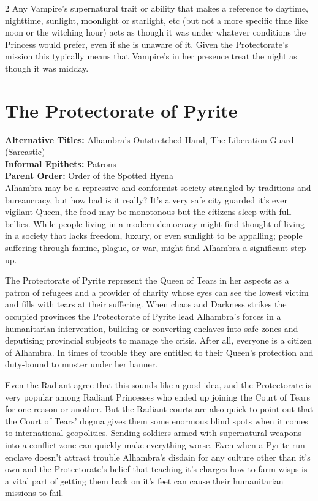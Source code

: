 \begin{multicols}{2}
Any Vampire’s supernatural trait or ability that makes a reference to daytime, nighttime, sunlight, moonlight or starlight, etc (but not a more specific time like noon or the witching hour) acts as though it was under whatever conditions the Princess would prefer, even if she is unaware of it. Given the Protectorate’s mission this typically means that Vampire’s in her presence treat the night as though it was midday. 


\section*{The Protectorate of Pyrite}
\label{sec:Pyrite}

\noindent \textbf{Alternative Titles:} Alhambra’s Outstretched Hand, The Liberation Guard (Sarcastic)\\

\noindent \textbf{Informal Epithets:} Patrons \\

\noindent \textbf{Parent Order:} Order of the Spotted Hyena \\

Alhambra may be a repressive and conformist society strangled by traditions and bureaucracy, but how bad is it really? It's a very safe city guarded it's ever vigilant Queen, the food may be monotonous but the citizens sleep with full bellies. While people living in a modern democracy might find thought of living in a society that lacks freedom, luxury, or even sunlight to be appalling; people suffering through famine, plague, or war, might find Alhambra a significant step up. 

The Protectorate of Pyrite represent the Queen of Tears in her aspects as a patron of refugees and a provider of charity whose eyes can see the lowest victim and fills with tears at their suffering. When chaos and Darkness strikes the occupied provinces the Protectorate of Pyrite lead Alhambra's forces in a humanitarian intervention, building or converting enclaves into safe-zones and deputising provincial subjects to manage the crisis. After all, everyone is a citizen of Alhambra. In times of trouble they are entitled to their Queen's protection and duty-bound to muster under her banner. 

Even the Radiant agree that this sounds like a good idea, and the Protectorate is very popular among Radiant Princesses who ended up joining the Court of Tears for one reason or another. But the Radiant courts are also quick to point out that the Court of Tears' dogma gives them some enormous blind spots when it comes to international geopolitics. Sending soldiers armed with supernatural weapons into a conflict zone can quickly make everything worse. Even when a Pyrite run enclave doesn't attract trouble Alhambra's disdain for any culture other than it's own and the Protectorate's belief that teaching it's charges how to farm wisps is a vital part of getting them back on it's feet can cause their humanitarian missions to fail. 


\end{multicols}
